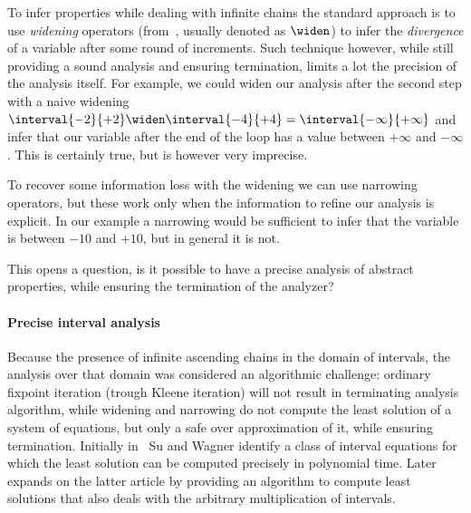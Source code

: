 To infer properties while dealing with infinite chains the standard
approach is to use \emph{widening} operators
(from~\cite{10.1007/3-540-55844-6_142}, usually denoted as \(\widen\))
to infer the \emph{divergence} of a variable after some round of
increments. Such technique however, while still providing a sound
analysis and ensuring termination, limits a lot the precision of the
analysis itself. For example, we could widen our analysis after the
second step with a naive widening
\(\interval{-2}{+2} \widen \interval{-4}{+4} =
\interval{-\infty}{+\infty}\) and infer that our variable after the
end of the loop has a value between \(+\infty\) and \(-\infty\). This
is certainly true, but is however very imprecise.

To recover some information loss with the widening we can use
narrowing operators, but these work only when the information to
refine our analysis is explicit. In our example a narrowing would be
sufficient to infer that the variable is between \(-10\) and \(+10\),
but in general it is not.

This opens a question, is it possible to have a precise analysis of
abstract properties, while ensuring the termination of the analyzer?

\paragraph*{Precise interval analysis} Because the presence of
infinite ascending chains in the domain of intervals, the analysis
over that domain was considered an algorithmic challenge: ordinary
fixpoint iteration (trough Kleene iteration) will not result in
terminating analysis algorithm, while widening and narrowing do not
compute the least solution of a system of equations, but only a safe
over approximation of it, while ensuring termination. Initially
in~\cite{SU2005122} Su and Wagner identify a class of interval
equations for which the least solution can be computed precisely in
polynomial time. Later~\cite{Gawlitza2009} expands on the latter
article by providing an algorithm to compute least solutions that also
deals with the arbitrary multiplication of intervals.

